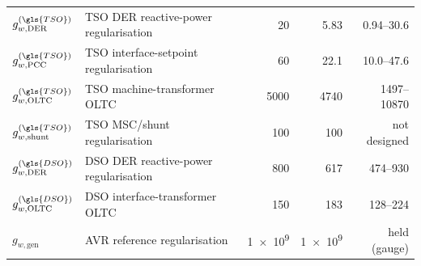 \begin{table}[htbp]
\begin{tabular}{l l r r r}
		$g_{w,\mathrm{DER}}^{(\gls{TSO})}$   & \gls{TSO} \gls{DER} reactive-power regularisation & \num{20} & \num{5.83} & \numrange{0.94}{30.6} \\
		$g_{w,\mathrm{PCC}}^{(\gls{TSO})}$   & \gls{TSO} interface-setpoint regularisation       & \num{60} & \num{22.1} & \numrange{10.0}{47.6} \\
		$g_{w,\mathrm{OLTC}}^{(\gls{TSO})}$  & \gls{TSO} machine-transformer \gls{OLTC}          & \num{5000} & \num{4740} & \numrange{1497}{10870} \\
		$g_{w,\mathrm{shunt}}^{(\gls{TSO})}$ & \gls{TSO} \gls{MSC}/shunt regularisation          & \num{100} & \num{100} & not designed \\
		$g_{w,\mathrm{DER}}^{(\gls{DSO})}$   & \gls{DSO} \gls{DER} reactive-power regularisation & \num{800} & \num{617} & \numrange{474}{930} \\
		$g_{w,\mathrm{OLTC}}^{(\gls{DSO})}$  & \gls{DSO} interface-transformer \gls{OLTC}        & \num{150} & \num{183} & \numrange{128}{224} \\
		$g_{w,\mathrm{gen}}$                 & \gls{AVR} reference regularisation                & \num{1e9} & \num{1e9} & held (gauge) \\
		\bottomrule
	\end{tabular}
\end{table}

